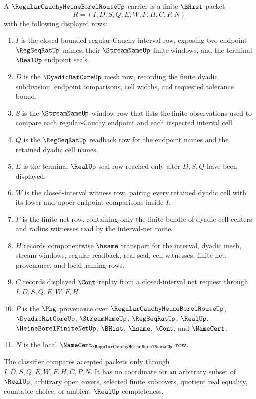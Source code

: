 \begin{definition}
\label{def:regular-cauchy-heine-borel-route-carrier}
A $\RegularCauchyHeineBorelRouteUp$ carrier is a finite $\BHist$ packet
$$
R=(I,D,S,Q,E,W,F,H,C,P,N)
$$
with the following displayed rows:
\begin{enumerate}
\item $I$ is the closed bounded regular-Cauchy interval row, exposing two endpoint $\RegSeqRatUp$ names, their $\StreamNameUp$ finite windows, and the terminal $\RealUp$ endpoint seals.
\item $D$ is the $\DyadicRatCoreUp$ mesh row, recording the finite dyadic subdivision, endpoint comparisons, cell widths, and requested tolerance bound.
\item $S$ is the $\StreamNameUp$ window row that lists the finite observations used to compare each regular-Cauchy endpoint and each inspected interval cell.
\item $Q$ is the $\RegSeqRatUp$ readback row for the endpoint names and the retained dyadic cell names.
\item $E$ is the terminal $\RealUp$ seal row reached only after $D,S,Q$ have been displayed.
\item $W$ is the closed-interval witness row, pairing every retained dyadic cell with its lower and upper endpoint comparisons inside $I$.
\item $F$ is the finite net row, containing only the finite bundle of dyadic cell centers and radius witnesses read by the interval-net route.
\item $H$ records componentwise $\hsame$ transport for the interval, dyadic mesh, stream windows, regular readback, real seal, cell witnesses, finite net, provenance, and local naming rows.
\item $C$ records displayed $\Cont$ replay from a closed-interval net request through $I,D,S,Q,E,W,F,H$.
\item $P$ is the $\Pkg$ provenance over $\RegularCauchyHeineBorelRouteUp$, $\DyadicRatCoreUp$, $\StreamNameUp$, $\RegSeqRatUp$, $\RealUp$, $\HeineBorelFiniteNetUp$, $\BHist$, $\hsame$, $\Cont$, and $\NameCert$.
\item $N$ is the local $\NameCert_{\RegularCauchyHeineBorelRouteUp}$ row.
\end{enumerate}
The classifier compares accepted packets only through $I,D,S,Q,E,W,F,H,C,P,N$. It has no coordinate for an arbitrary subset of $\RealUp$, arbitrary open covers, selected finite subcovers, quotient real equality, countable choice, or ambient $\RealUp$ completeness.
\end{definition}

